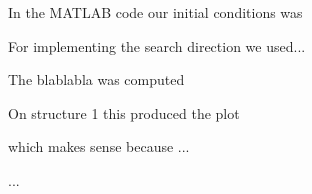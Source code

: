 In the MATLAB code our initial conditions was
%
%
%
%

For implementing the search direction we used...


The blablabla was computed



On structure 1 this produced the plot

which makes sense because ...

...